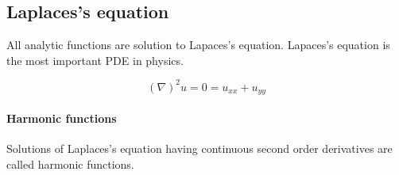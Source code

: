 \subsection{Laplaces's equation}
All analytic functions are solution to Lapaces's equation. Lapaces's
equation is the most important PDE in physics.

\begin{equation}
  (\nabla)^2 u = 0 =u_{xx}+ u_{yy}
\end{equation}

\paragraph{Harmonic functions} Solutions of Laplaces's equation having
continuous second order derivatives are called harmonic functions.
